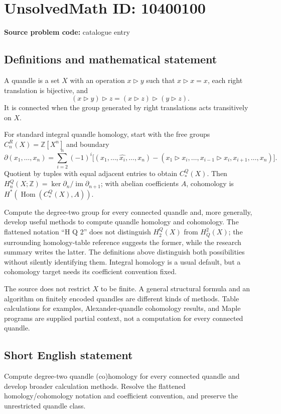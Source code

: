 \documentclass[11pt]{article}
\begin{document}
\section*{UnsolvedMath ID: 10400100}
\textbf{Source problem code:} catalogue entry
\subsection{Definitions and mathematical statement}
A quandle is a set $X$ with an operation $x\triangleright y$ such that $x\triangleright x=x$, each right translation is bijective, and
\[
(x\triangleright y)\triangleright z=(x\triangleright z)\triangleright(y\triangleright z).
\]
It is connected when the group generated by right translations acts transitively on $X$.

For standard integral quandle homology, start with the free groups $C_n^R(X)=\mathbb Z[X^n]$ and boundary
\[
\partial(x_1,\ldots,x_n)=\sum_{i=2}^n(-1)^i\bigl[(x_1,\ldots,\widehat{x_i},\ldots,x_n)
-(x_1\triangleright x_i,\ldots,x_{i-1}\triangleright x_i,x_{i+1},\ldots,x_n)\bigr].
\]
Quotient by tuples with equal adjacent entries to obtain $C_*^Q(X)$. Then $H_n^Q(X;\mathbb Z)=\ker\partial_n/\operatorname{im}\partial_{n+1}$; with abelian coefficients $A$, cohomology is $H^*(\operatorname{Hom}(C_*^Q(X),A))$.

Compute the degree-two group for every connected quandle and, more generally, develop useful methods to compute quandle homology and cohomology. The flattened notation ``H Q 2'' does not distinguish $H_2^Q(X)$ from $H_Q^2(X)$; the surrounding homology-table reference suggests the former, while the research summary writes the latter. The definitions above distinguish both possibilities without silently identifying them. Integral homology is a usual default, but a cohomology target needs its coefficient convention fixed.

The source does not restrict $X$ to be finite. A general structural formula and an algorithm on finitely encoded quandles are different kinds of methods. Table calculations for examples, Alexander-quandle cohomology results, and Maple programs are supplied partial context, not a computation for every connected quandle.
\subsection{Short English statement}
Compute degree-two quandle (co)homology for every connected quandle and develop broader calculation methods. Resolve the flattened homology/cohomology notation and coefficient convention, and preserve the unrestricted quandle class.
\end{document}
